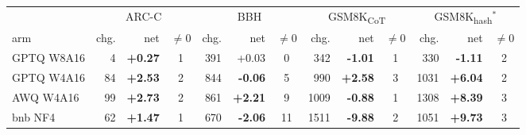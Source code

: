 \begin{tabular}{lrrcrrcrrcrrc}
\toprule
& \multicolumn{3}{c}{ARC-C} & \multicolumn{3}{c}{BBH} & \multicolumn{3}{c}{GSM8K\textsubscript{CoT}} & \multicolumn{3}{c}{GSM8K\textsubscript{hash}$^{*}$} \\
\cmidrule(lr){2-13}
arm & chg. & net & $\neq$0 & chg. & net & $\neq$0 & chg. & net & $\neq$0 & chg. & net & $\neq$0 \\
\midrule
GPTQ W8A16 & 4 & \textbf{+0.27} & 1 & 391 & +0.03 & 0 & 342 & \textbf{-1.01} & 1 & 330 & \textbf{-1.11} & 2 \\
GPTQ W4A16 & 84 & \textbf{+2.53} & 2 & 844 & \textbf{-0.06} & 5 & 990 & \textbf{+2.58} & 3 & 1031 & \textbf{+6.04} & 2 \\
AWQ W4A16 & 99 & \textbf{+2.73} & 2 & 861 & \textbf{+2.21} & 9 & 1009 & \textbf{-0.88} & 1 & 1308 & \textbf{+8.39} & 3 \\
bnb NF4 & 62 & \textbf{+1.47} & 1 & 670 & \textbf{-2.06} & 11 & 1511 & \textbf{-9.88} & 2 & 1051 & \textbf{+9.73} & 3 \\
\bottomrule
\end{tabular}
